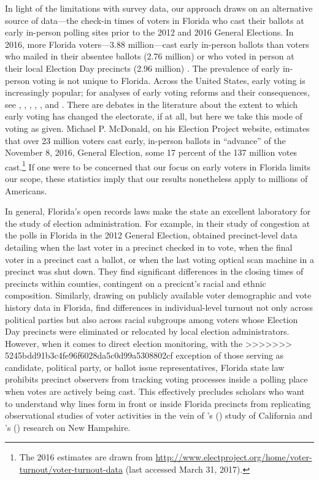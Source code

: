 \documentclass[12pt,titlepage]{article}
\newcommand{\possessivecite}[1]{\citeauthor{#1}'s (\citeyear{#1})}
\begin{document}
In light of the limitations with survey data, our approach draws on an
alternative source of data---the check-in times of voters in
Florida who cast their ballots at early in-person polling sites prior to the 2012 and 2016 General Elections. 
In 2016, more Florida voters---3.88 million---cast early in-person ballots than voters who mailed in their absentee ballots (2.76 million) or who voted in person at their local Election Day precincts (2.96 million) \citep{FDOS:2016vote}. The prevalence of early in-person voting is not unique to Florida. Across the United States, early voting is increasingly popular; for
analyses of early voting reforms and their consequences, see 
\citet{neelyrichardson:earlyvoting}, \citet{gronke:2012}, 
\citet{gronke:earlyvotingreforms}, \citet{gronketoffey:psychological},
\citet{gronkebaum:growth}, and \citet{burdenetal:unanticipated}.
There are debates in the literature about the extent to which early
voting has changed the electorate, if at all, but here we take this
mode of voting as given.  Michael P. McDonald, on his Election Project website,
estimates that over 23 million voters cast early, in-person ballots in
``advance'' of the November 8, 2016, General Election, some 17 percent
of the 137 million votes cast.\footnote{The 2016 estimates are drawn from
 \url{http://www.electproject.org/home/voter-turnout/voter-turnout-data}
 (last accessed March 31, 2017).}  If one were to be concerned that
our focus on early voters in Florida limits our scope, these
statistics imply that our results nonetheless apply to millions of
Americans.

In general, Florida's open records laws make the state an excellent laboratory for
the study of election administration. For example, in their study of congestion at the
polls in Florida in the 2012 General Election, \cite{herronsmith:closingtimes} obtained precinct-level
data detailing when the last voter in a precinct checked in to vote,
when the final voter in a precinct cast a ballot, or when the last
voting optical scan machine in a precinct was shut down. They find significant differences in the closing times of precincts within counties, contingent on a precicnt's racial and ethnic composition. Similarly, drawing on publicly available voter demographic and vote history data in Florida,   
\cite{amos_etal2017} find differences in individual-level turnout not only across political parties but also across racial subgroups
among voters whose Election Day precincts were eliminated or relocated by local election administrators.  
However, when it comes to direct election monitoring, with the
>>>>>>> 5245bdd91b3c4fe96f6028da5c0d99a5308802cf
exception of those serving as candidate, political party, or ballot
issue representatives, Florida state law prohibits precinct observers
from tracking voting processes inside a polling place when votes are
actively being cast. This effectively precludes scholars who want to
understand why lines form in front or inside Florida precincts
from replicating observational studies of voter activities in the vein
of \possessivecite{spencermarkovits:renege} study of California and
\possessivecite{herronsmith:hanoverstudy} research on New Hampshire.
\end{document}
